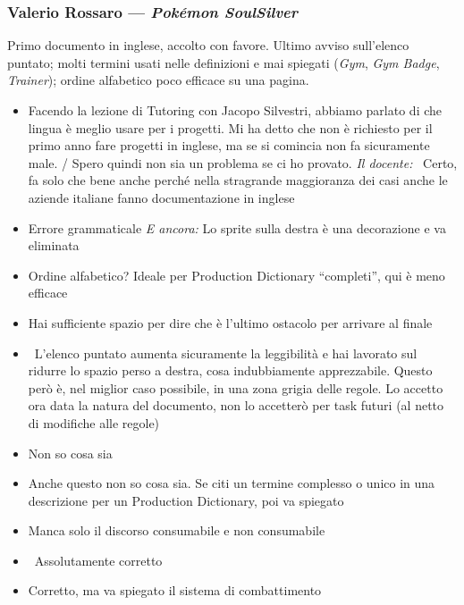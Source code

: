 \subsubsection{Valerio Rossaro --- \emph{Pokémon SoulSilver}}
Primo documento in inglese, accolto con favore. Ultimo avviso sull'elenco
puntato; molti termini usati nelle definizioni e mai spiegati (\emph{Gym},
\emph{Gym Badge}, \emph{Trainer}); ordine alfabetico poco efficace su una
pagina.
{\small
\begin{itemize}
  \item {}  Facendo la lezione di Tutoring con Jacopo Silvestri, abbiamo parlato di che lingua è meglio usare per i progetti. Mi ha detto che non è richiesto per il primo anno fare progetti in inglese, ma se si comincia non fa sicuramente male. / Spero quindi non sia un problema se ci ho provato. \emph{Il docente:} \rvBene\ Certo, fa solo che bene anche perché nella stragrande maggioranza dei casi anche le aziende italiane fanno documentazione in inglese
  \item {} Errore grammaticale \emph{E ancora:} Lo sprite sulla destra è una decorazione e va eliminata
  \item {} Ordine alfabetico? Ideale per Production Dictionary ``completi'', qui è meno efficace
  \item {} Hai sufficiente spazio per dire che è l'ultimo ostacolo per arrivare al finale
  \item {} \rvAvviso\ L'elenco puntato aumenta sicuramente la leggibilità e hai lavorato sul ridurre lo spazio perso a destra, cosa indubbiamente apprezzabile. Questo però è, nel miglior caso possibile, in una zona grigia delle regole. Lo accetto ora data la natura del documento, non lo accetterò per task futuri (al netto di modifiche alle regole)
  \item {} Non so cosa sia
  \item {} Anche questo non so cosa sia. Se citi un termine complesso o unico in una descrizione per un Production Dictionary, poi va spiegato
  \item {} Manca solo il discorso consumabile e non consumabile
  \item {} \rvBene\ Assolutamente corretto
  \item {} Corretto, ma va spiegato il sistema di combattimento

\end{itemize}}
